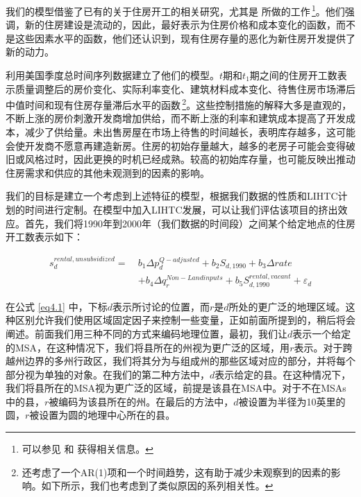 \documentclass[lang=cn,11pt,a4paper]{paper}
\begin{document}
我们的模型借鉴了已有的关于住房开工的相关研究，尤其是 \cite{Mayer200085} 所做的工作\,\footnote{可以参见 \cite{Topel1988718} 和 \cite{DiPasquale1992337} 获得相关信息。}。他们强调，新的住房建设是流动的，因此，最好表示为住房价格和成本变化的函数，而不是这些因素水平的函数，他们还认识到，现有住房存量的恶化为新住房开发提供了新的动力。

\cite{Mayer200085} 利用美国季度总时间序列数据建立了他们的模型。$t$期和$t_1$期之间的住房开工数表示质量调整后的房价变化、实际利率变化、建筑材料成本变化、待售住房市场滞后中值时间和现有住房存量滞后水平的函数\,\footnote{\cite{Mayer200085} 还考虑了一个AR(1)项和一个时间趋势，这有助于减少未观察到的因素的影响。如下所示，我们也考虑到了类似原因的系列相关性。}。这些控制措施的解释大多是直观的，不断上涨的房价刺激开发商增加供给，而不断上涨的利率和建筑成本提高了开发成本，减少了供给量。未出售房屋在市场上待售的时间越长，表明库存越多，这可能会使开发商不愿意再建造新房。住房的初始存量越大，越多的老房子可能会变得破旧或风格过时，因此更换的时机已经成熟。较高的初始库存量，也可能反映出推动住房需求和供应的其他未观测到的因素的影响。

我们的目标是建立一个考虑到上述特征的模型，根据我们数据的性质和LIHTC计划的时间进行定制。在模型中加入LIHTC发展，可以让我们评估该项目的挤出效应。首先，我们将1990年到2000年（我们数据的时间段）之间某个给定地点的住房开工数表示如下：

\begin{equation}\label{eq4.1}
  \begin{aligned}
  s_{d}^{rental,unsubsidized}=\ & b_{1} \Delta p_{d}^{Q-adjusted}+b_{2} S_{d, 1990}+b_{3} \Delta r a t e \\
  &+b_{4} \Delta q_{r}^{Non-Landinputs}+b_{5} S_{d, 1990}^{rental, vacant}+\varepsilon_{d}
  \end{aligned}
\end{equation}
\vspace{2pt}

在公式 \eqref{eq4.1} 中，下标$d$表示所讨论的位置，而$r$是$d$所处的更广泛的地理区域。这种区别允许我们使用区域固定因子来控制一些变量，正如前面所提到的，稍后将会阐述。前面我们用三种不同的方式来编码地理位置，最初，我们让$d$表示一个给定的MSA，在这种情况下，我们将县所在的州视为更广泛的区域，用$r$表示。对于跨越州边界的多州行政区，我们将其分为与组成州的那些区域对应的部分，并将每个部分视为单独的对象。在我们的第二种方法中，$d$表示给定的县。在这种情况下，我们将县所在的MSA视为更广泛的区域，前提是该县在MSA中。对于不在MSAs中的县，$r$被编码为该县所在的州。在最后的方法中，$d$被设置为半径为10英里的圆，$r$被设置为圆的地理中心所在的县。
\end{document}

